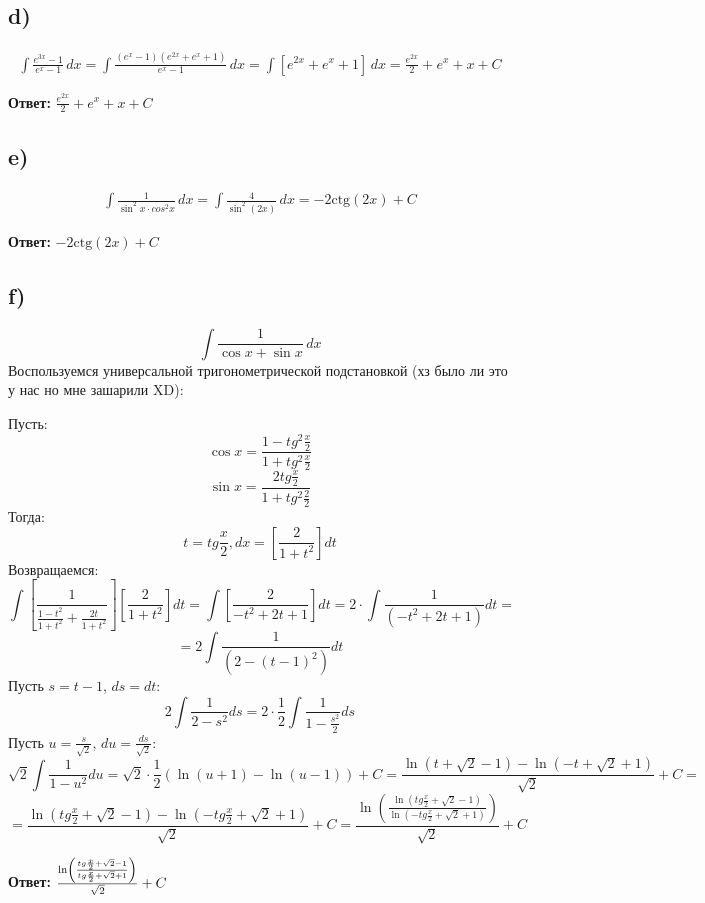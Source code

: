 \documentclass[a4paper,12pt]{article}
\begin{document}
\subsection*{d)}
\begin{equation*}
\begin{gathered}
\int \frac{e^{3x} - 1}{e^x - 1} \, dx = \int \frac{(e^x -1)(e^{2x} + e^x + 1)}{e^x -1} \,dx = \int \left[e^{2x} + e^x + 1\right] \,dx = \frac{e^{2x}}{2} + e^x +  x + C
\end{gathered}
\end{equation*}
{\Large \begin{center}
\textbf{Ответ: } $\frac{e^{2x}}{2} + e^x +  x + C$
\end{center}}
\subsection*{e)}
\begin{equation*}
\begin{gathered}
\int \frac{1}{\sin^2 x \cdot cos^2 x} \,dx = \int \frac{4}{\sin^2 \left( 2x\right)} \,dx = - 2 \text{ctg} \left(2x\right) + C
\end{gathered}
\end{equation*}
{\Large \begin{center}
\textbf{Ответ: } $- 2 \text{ctg} \left(2x\right) + C$
\end{center}}
\subsection*{f)}
\[
\int \frac{1}{\cos x + \sin x} \,dx
\]
Воспользуемся универсальной тригонометрической подстановкой (хз было ли это у нас но мне зашарили XD):

Пусть:
\[
\cos x = \frac{1 - tg^2 \frac{x}{2}}{1 + tg^2 \frac{x}{2}}
\]
\[
\sin x = \frac{2 tg \frac{x}{2}}{1 + tg^2 \frac{2}{2}}
\]
Тогда:
\[
t = tg \frac{x}{2}, dx = \left[\frac{2}{1 + t^2} \right]dt
\]
Возвращаемся:
\[
\int \left[ \frac{1}{\frac{1 - t^2}{1 + t^2} +\frac{2t}{1 + t^2}} \right]\left[\frac{2}{1 + t^2} \right]dt =\int \left[ \frac{2}{-t^2 + 2t+ 1} \right] dt = 2 \cdot \int \frac{1}{(-t^2 +2t +1)} dt = 
\]
\[
= 2 \int \frac{1}{(2 - (t-1)^2)}dt 
\]
Пусть $ s = t -1$, $ds = dt$:
\[
2 \int \frac{1}{2 - s^2} ds = 2 \cdot \frac{1}{2} \int \frac{1}{1 - \frac{s^2}{2}} ds 
\]
Пусть $ u = \frac{s}{\sqrt{2}}$,  $du = \frac{ds}{\sqrt{2}}$:
\[
\sqrt{2} \int \frac{1}{1 - u^2} du =  \sqrt{2} \cdot \frac{1}{2} (\ln(u + 1) - \ln(u-1))  + C= \frac{\ln ( t + \sqrt{2} -1) - \ln(-t + \sqrt{2} + 1)}{\sqrt{2}} + C= 
\]
\[
= \frac{\ln ( tg \frac{x}{2} + \sqrt{2} -1) - \ln(-tg \frac{x}{2} + \sqrt{2} + 1)}{\sqrt{2}} + C=  \frac{\ln \left(\frac{\ln ( tg \frac{x}{2} + \sqrt{2} -1) }{\ln(-tg \frac{x}{2} + \sqrt{2} + 1)}\right)}{\sqrt{2}} + C
\]
{\Large \begin{center}
\textbf{Ответ: } $ \frac{\ln \left(\frac{tg \frac{x}{2} + \sqrt{2} -1}{\-tg \frac{x}{2} + \sqrt{2} + 1}\right)}{\sqrt{2}} + C$ 
\end{center}}
\end{document}
